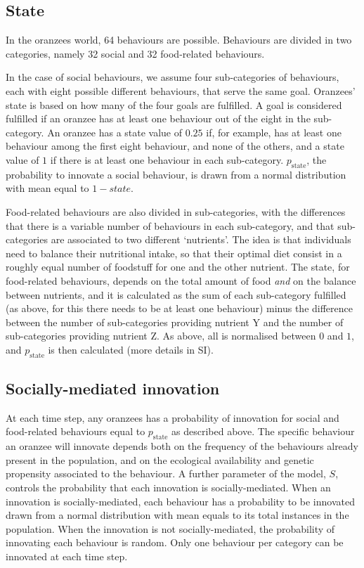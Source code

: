 \documentclass[9pt,twocolumn,twoside,]{pnas-new}
\begin{document}
\subsection*{State}\label{format}

In the oranzees world, 64 behaviours are possible. Behaviours are
divided in two categories, namely 32 social and 32 food-related
behaviours.

In the case of social behaviours, we assume four sub-categories of
behaviours, each with eight possible different behaviours, that serve
the same goal. Oranzees' state is based on how many of the four goals
are fulfilled. A goal is considered fulfilled if an oranzee has at least
one behaviour out of the eight in the sub-category. An oranzee has a
state value of \(0.25\) if, for example, has at least one behaviour
among the first eight behaviour, and none of the others, and a state
value of \(1\) if there is at least one behaviour in each sub-category.
\(p_\text{state}\), the probability to innovate a social behaviour, is
drawn from a normal distribution with mean equal to \(1-state\).

Food-related behaviours are also divided in sub-categories, with the
differences that there is a variable number of behaviours in each
sub-category, and that sub-categories are associated to two different
`nutrients'. The idea is that individuals need to balance their
nutritional intake, so that their optimal diet consist in a roughly
equal number of foodstuff for one and the other nutrient. The state, for
food-related behaviours, depends on the total amount of food \emph{and}
on the balance between nutrients, and it is calculated as the sum of
each sub-category fulfilled (as above, for this there needs to be at
least one behaviour) minus the difference between the number of
sub-categories providing nutrient Y and the number of sub-categories
providing nutrient Z. As above, all is normalised between \(0\) and
\(1\), and \(p_\text{state}\) is then calculated (more details in SI).

\subsection*{Socially-mediated innovation}\label{format}

At each time step, any oranzees has a probability of innovation for
social and food-related behaviours equal to \(p_\text{state}\) as
described above. The specific behaviour an oranzee will innovate depends
both on the frequency of the behaviours already present in the
population, and on the ecological availability and genetic propensity
associated to the behaviour. A further parameter of the model, \(S\),
controls the probability that each innovation is socially-mediated. When
an innovation is socially-mediated, each behaviour has a probability to
be innovated drawn from a normal distribution with mean equals to its
total instances in the population. When the innovation is not
socially-mediated, the probability of innovating each behaviour is
random. Only one behaviour per category can be innovated at each time
step.
\end{document}
